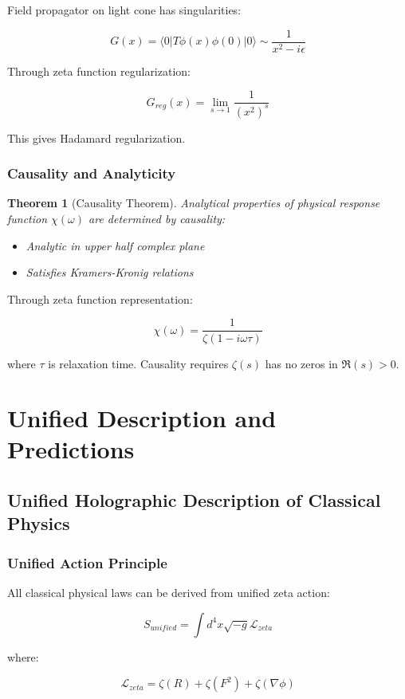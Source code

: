 \documentclass[12pt,a4paper]{article}
\newtheorem{theorem}{Theorem}[section]
\begin{document}
Field propagator on light cone has singularities:

$$G(x) = \langle 0|T\phi(x)\phi(0)|0\rangle \sim \frac{1}{x^2 - i\epsilon}$$

Through zeta function regularization:

$$G_{reg}(x) = \lim_{s \to 1} \frac{1}{(x^2)^s}$$

This gives Hadamard regularization.

\subsubsection{Causality and Analyticity}

\begin{theorem}[Causality Theorem]
Analytical properties of physical response function $\chi(\omega)$ are determined by causality:
\begin{itemize}
\item Analytic in upper half complex plane
\item Satisfies Kramers-Kronig relations
\end{itemize}
\end{theorem}

Through zeta function representation:

$$\chi(\omega) = \frac{1}{\zeta(1 - i\omega\tau)}$$

where $\tau$ is relaxation time. Causality requires $\zeta(s)$ has no zeros in $\Re(s) > 0$.

\section{Unified Description and Predictions}

\subsection{Unified Holographic Description of Classical Physics}

\subsubsection{Unified Action Principle}

All classical physical laws can be derived from unified zeta action:

$$S_{unified} = \int d^4x \sqrt{-g} \mathcal{L}_{zeta}$$

where:

$$\mathcal{L}_{zeta} = \zeta(R) + \zeta(F^2) + \zeta(\nabla\phi)$$
\end{document}
